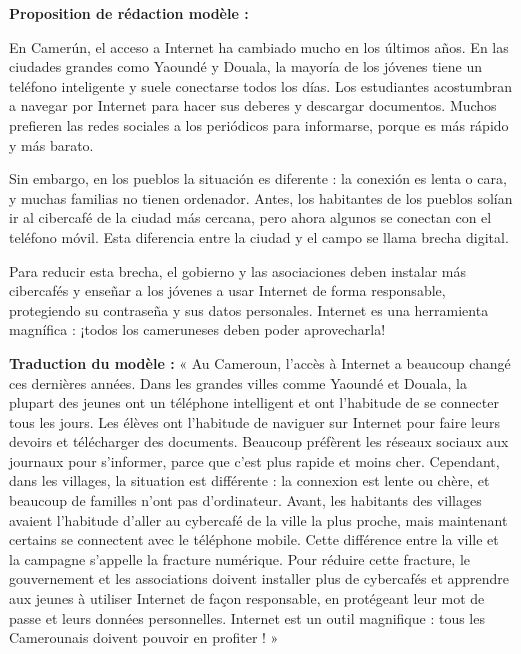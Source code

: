 \documentclass[11pt]{article}
\begin{document}
\begin{corrige}
\textbf{Proposition de rédaction modèle :}

\begin{textebox}
En Camerún, el acceso a Internet ha cambiado mucho en los últimos años. En las ciudades grandes como Yaoundé y Douala, la mayoría de los jóvenes tiene un teléfono inteligente y suele conectarse todos los días. Los estudiantes acostumbran a navegar por Internet para hacer sus deberes y descargar documentos. Muchos prefieren las redes sociales a los periódicos para informarse, porque es más rápido y más barato.

Sin embargo, en los pueblos la situación es diferente : la conexión es lenta o cara, y muchas familias no tienen ordenador. Antes, los habitantes de los pueblos solían ir al cibercafé de la ciudad más cercana, pero ahora algunos se conectan con el teléfono móvil. Esta diferencia entre la ciudad y el campo se llama brecha digital.

Para reducir esta brecha, el gobierno y las asociaciones deben instalar más cibercafés y enseñar a los jóvenes a usar Internet de forma responsable, protegiendo su contraseña y sus datos personales. Internet es una herramienta magnífica : ¡todos los cameruneses deben poder aprovecharla!
\end{textebox}

\textbf{Traduction du modèle :} « Au Cameroun, l'accès à Internet a beaucoup changé ces dernières années. Dans les grandes villes comme Yaoundé et Douala, la plupart des jeunes ont un téléphone intelligent et ont l'habitude de se connecter tous les jours. Les élèves ont l'habitude de naviguer sur Internet pour faire leurs devoirs et télécharger des documents. Beaucoup préfèrent les réseaux sociaux aux journaux pour s'informer, parce que c'est plus rapide et moins cher. Cependant, dans les villages, la situation est différente : la connexion est lente ou chère, et beaucoup de familles n'ont pas d'ordinateur. Avant, les habitants des villages avaient l'habitude d'aller au cybercafé de la ville la plus proche, mais maintenant certains se connectent avec le téléphone mobile. Cette différence entre la ville et la campagne s'appelle la fracture numérique. Pour réduire cette fracture, le gouvernement et les associations doivent installer plus de cybercafés et apprendre aux jeunes à utiliser Internet de façon responsable, en protégeant leur mot de passe et leurs données personnelles. Internet est un outil magnifique : tous les Camerounais doivent pouvoir en profiter ! »


\end{corrige}
\end{document}
